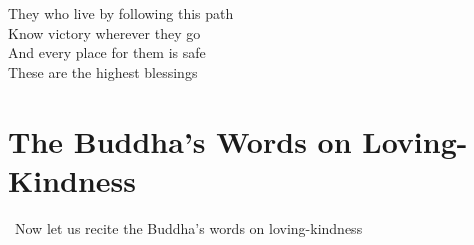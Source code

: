 \begin{english-only}
  They who live by following this path\\
  Know victory wherever they go\\
  And every place for them is safe\\
  These are the highest blessings
\end{english-only}

\suttaRef{[Snp 2.4]}


\section{The Buddha's Words on Loving-Kindness}
\label{words-on-loving-kindness}

\begin{leader-english}
  \anglebracketleft\ \hspace{-0.5mm}Now let us recite the Buddha's words on loving-kindness \hspace{-0.5mm}\anglebracketright\
\end{leader-english}

